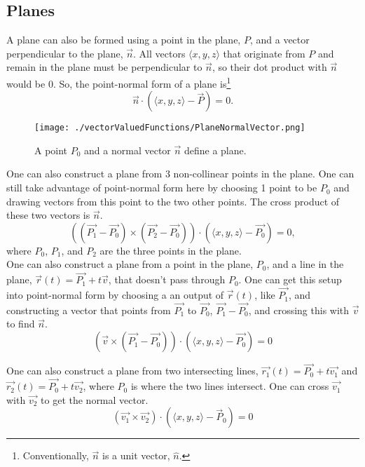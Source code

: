 \subsection{Planes}
\noindent
A plane can also be formed using a point in the plane, $P$, and a vector perpendicular to the plane, $\vec{n}$.
All vectors $\langle x,y,z \rangle$ that originate from $P$ and remain in the plane must be perpendicular to $\vec{n}$, so their dot product with $\vec{n}$ would be 0.
So, the point-normal form of a plane is\footnote{Conventionally, $\vec{n}$ is a unit vector, $\hat{n}$.}
\begin{equation*}
	\vec{n}\cdot\left(\langle x,y,z \rangle - \vec{P}\right) = 0.
\end{equation*}

\begin{figure}[H]
	\centering
	\texttt{[image: ./vectorValuedFunctions/PlaneNormalVector.png]}
	\caption{A point $P_0$ and a normal vector $\vec{n}$ define a plane.}
\end{figure}

\noindent
One can also construct a plane from 3 non-collinear points in the plane.
One can still take advantage of point-normal form here by choosing 1 point to be $P_0$ and drawing vectors from this point to the two other points.
The cross product of these two vectors is $\vec{n}$.
\begin{equation*}
	\left(\left(\vec{P_1} - \vec{P_0}\right) \times \left(\vec{P_2} - \vec{P_0}\right)\right) \cdot \left(\langle x,y,z \rangle - \vec{P_0}\right) = 0,
\end{equation*}
where $P_0$, $P_1$, and $P_2$ are the three points in the plane.\\

\noindent
One can also construct a plane from a point in the plane, $P_0$, and a line in the plane, $\vec{r}(t) = \vec{P_1} + t\vec{v}$, that doesn't pass through $P_0$.
One can get this setup into point-normal form by choosing a an output of $\vec{r}(t)$, like $\vec{P_1}$, and constructing a vector that points from $\vec{P_1}$ to $\vec{P_0}$, $\vec{P_1}-\vec{P_0}$, and crossing this with $\vec{v}$ to find $\vec{n}$.
\begin{equation*}
	\left(\vec{v} \times \left(\vec{P_1} - \vec{P_0}\right)\right) \cdot \left(\langle x,y,z \rangle - \vec{P_0}\right) = 0
\end{equation*}

\noindent
One can also construct a plane from two intersecting lines, $\vec{r_1}(t) = \vec{P_0} + t\vec{v_1}$ and $\vec{r_2}(t) = \vec{P_0} + t\vec{v_2}$, where $P_0$ is where the two lines intersect.
One can cross $\vec{v_1}$ with $\vec{v_2}$ to get the normal vector.
\begin{equation*}
	\left(\vec{v_1} \times \vec{v_2}\right) \cdot \left(\langle x,y,z \rangle - \vec{P}_{0}\right) = 0
\end{equation*}